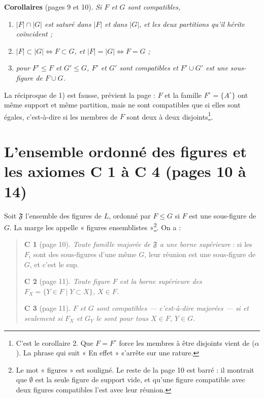\documentclass[11pt,a4paper]{article}
\begin{document}
\textbf{Corollaires} (pages 9 et 10). \emph{Si $F$ et $G$ sont compatibles,}
\begin{enumerate}
\item[1)] \emph{$|F| \cap |G|$ est saturé dans $|F|$ et dans $|G|$, et les deux
partitions qu'il hérite coïncident ;}
\item[2)] \emph{$|F| \subset |G| \iff F \subset G$, et $|F| = |G| \iff F = G$ ;}
\item[3)] \emph{pour $F' \leq F$ et $G' \leq G$, $F'$ et $G'$ sont compatibles
et $F' \cup G'$ est une sous-figure de $F \cup G$.}
\end{enumerate}

La réciproque de 1) est fausse, prévient la page : $F$ et la famille $F^{\circ}
= \{A^{\circ}\}$ ont même support et même partition, mais ne sont compatibles
que si elles sont égales, c'est-à-dire si les membres de $F$ sont deux à deux
disjoints\footnote{C'est le corollaire 2. Que $F = F^{\circ}$ force les membres
à être disjoints vient de ($\alpha$). La phrase qui suit « En effet » s'arrête
sur une rature.}.

\section*{L'ensemble ordonné des figures et les axiomes C 1 à C 4 (pages 10 à 14)}

Soit $\mathfrak{F}$ l'ensemble des figures de $L$, ordonné par $F \leq G$ si $F$
est une sous-figure de $G$. La marge les appelle « figures
ensemblistes »\footnote{Le mot « figures » est souligné. Le reste de la page 10
est barré : il montrait que $\emptyset$ est la seule figure de support vide, et
qu'une figure compatible avec deux figures compatibles l'est avec leur
réunion.}. On a :

\begin{quote}
\textbf{C 1} (page 10). \emph{Toute famille majorée de $\mathfrak{F}$ a une
borne supérieure} : si les $F_{i}$ sont des sous-figures d'une même $G$, leur
réunion est une sous-figure de $G$, et c'est le sup.

\textbf{C 2} (page 11). \emph{Toute figure $F$ est la borne supérieure des
$F_{X} = \{Y \in F \mid Y \subset X\}$, $X \in F$.}

\textbf{C 3} (page 11). \emph{$F$ et $G$ sont compatibles --- c'est-à-dire
majorées --- si et seulement si $F_{X}$ et $G_{Y}$ le sont pour tous $X \in F$,
$Y \in G$.}
\end{quote}
\end{document}
